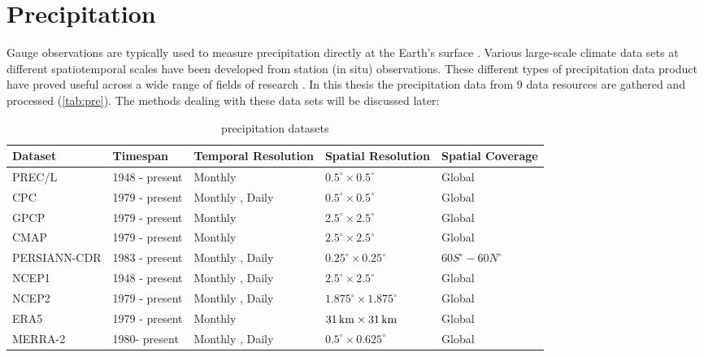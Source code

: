 \section{Precipitation}
Gauge observations are typically used to measure precipitation directly at the Earth's surface \cite{kidd2001satellite}. Various large-scale climate data sets at different spatiotemporal scales have been developed from station (in situ) observations. These different types of precipitation data product have proved useful across a wide range of fields of research \cite{sun2018review}.
In this thesis the precipitation data from 9 data resources are gathered and processed (\autoref{tab:pre}). The methods dealing with these data sets will be discussed later:
\begin{table}[htbp]\centering 
	\begin{tabular}{|l|l|l|l|l|}
		\hline
		\textbf{Dataset}      & \textbf{Timespan}       & \textbf{Temporal Resolution} & \textbf{Spatial Resolution} & \textbf{Spatial Coverage} \\ \hline
		PREC/L       & 1948 - present & Monthly             & $0.5^{\circ} \times 0.5^{\circ}$          & Global           \\ \hline
		CPC          & 1979 - present & Monthly , Daily    & $0.5^{\circ} \times 0.5^{\circ}$          & Global           \\ \hline
		GPCP         & 1979 - present & Monthly             & $2.5^{\circ} \times 2.5^{\circ}$          & Global           \\ \hline
		CMAP         & 1979 - present & Monthly             & $2.5^{\circ} \times 2.5^{\circ}$          & Global           \\ \hline
		PERSIANN-CDR & 1983 - present & Monthly , Daily    & $0.25^{\circ} \times 0.25^{\circ}$        & $60S^{\circ} - 60N^{\circ}$      \\ \hline
		NCEP1        & 1948 - present & Monthly , Daily    & $2.5^{\circ} \times 2.5^{\circ}$          & Global           \\ \hline
		NCEP2        & 1979 - present & Monthly , Daily    & $1.875^{\circ} \times 1.875^{\circ}$      & Global           \\ \hline
		ERA5         & 1979 - present & Monthly             & $31\,\mathrm{km} \times 31\,\mathrm{km}$        & Global           \\ \hline
		MERRA-2      & 1980- present  & Monthly , Daily    & $0.5^{\circ} \times 0.625^{\circ}$        & Global           \\ \hline
	\end{tabular}
	\caption{precipitation datasets}
	\label{tab:pre}
\end{table}
